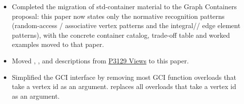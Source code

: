 \begin{itemize}
      \item Completed the migration of std-container material to the Graph Containers proposal: this
            paper now states only the normative recognition patterns (random-access / associative vertex
            patterns and the integral// edge element patterns), with the concrete
            container catalog, trade-off table and worked examples moved to that paper.
      \item Moved , , and  descriptions from
            \href{https://www.wg21.link/P3129}{P3129 Views} to this paper.
      \item Simplified the GCI interface by removing most GCI function overloads that take a vertex id as an argument.
             replaces all overloads that take a vertex id as an argument.
\end{itemize}
